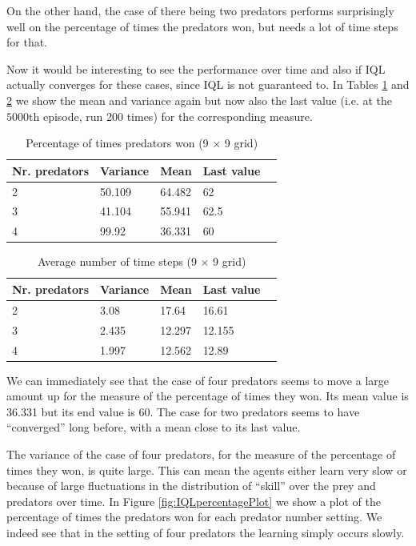On the other hand, the case of there being two predators performs surprisingly well on the percentage of times the predators won, but needs a lot of time steps for that.

\FloatBarrier

Now it would be interesting to see the performance over time and also if IQL actually converges for these cases, since IQL is not guaranteed to.
In Tables \ref{tab:percentage} and \ref{tab:timeSteps} we show the mean and variance again but now also the last value (i.e. at the $5000\mathrm{th}$ episode, run 200 times) for the corresponding  measure.

\begin{table}[hbt]
\centering
\begin{tabular}{lllll}
 Nr. predators  &  Variance& Mean & Last value   \\ 
\hline   
 2 & 50.109 & 64.482 & 62   \\ 
 3 & 41.104 & 55.941 & 62.5   \\ 
 4 & 99.92  & 36.331 & 60   \\  
\end{tabular} 
\caption{Percentage of times predators won (9 $\times$ 9 grid)}
\label{tab:percentage}
\end{table}

\begin{table}[hbt]
\centering
\begin{tabular}{lllll}
 Nr. predators  &  Variance& Mean & Last value   \\ 
\hline   
 2 &3.08 & 17.64 & 16.61   \\ 
 3 & 2.435 & 12.297 & 12.155   \\ 
 4 & 1.997  & 12.562 & 12.89   \\  
\end{tabular} 
\caption{Average number of time steps  (9 $\times$ 9 grid)}
\label{tab:timeSteps}
\end{table}

We can immediately see that the case of four predators seems to move a large amount up for the measure of the percentage of times they won. Its mean value is 36.331 but its end value is 60. The case for two predators seems to have ``converged'' long before, with a mean close to its last value.

The variance of the case of four predators, for the measure of the percentage of times they won, is quite large.
This can mean the agents either learn very slow or because of large fluctuations in the distribution of ``skill'' over the prey and predators over time. In Figure \ref{fig:IQLpercentagePlot} we show a plot of the percentage of times the predators won for each predator number setting. We indeed see that in the setting of four predators the learning simply occurs slowly.


